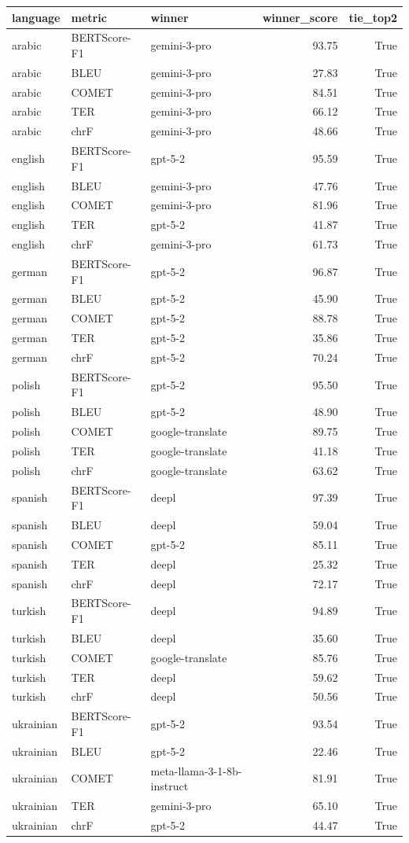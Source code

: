 \begin{tabular}{lllrr}
\toprule
language & metric & winner & winner\_score & tie\_top2 \\
\midrule
arabic & BERTScore-F1 & gemini-3-pro & 93.75 & True \\
arabic & BLEU & gemini-3-pro & 27.83 & True \\
arabic & COMET & gemini-3-pro & 84.51 & True \\
arabic & TER & gemini-3-pro & 66.12 & True \\
arabic & chrF & gemini-3-pro & 48.66 & True \\
english & BERTScore-F1 & gpt-5-2 & 95.59 & True \\
english & BLEU & gemini-3-pro & 47.76 & True \\
english & COMET & gemini-3-pro & 81.96 & True \\
english & TER & gpt-5-2 & 41.87 & True \\
english & chrF & gemini-3-pro & 61.73 & True \\
german & BERTScore-F1 & gpt-5-2 & 96.87 & True \\
german & BLEU & gpt-5-2 & 45.90 & True \\
german & COMET & gpt-5-2 & 88.78 & True \\
german & TER & gpt-5-2 & 35.86 & True \\
german & chrF & gpt-5-2 & 70.24 & True \\
polish & BERTScore-F1 & gpt-5-2 & 95.50 & True \\
polish & BLEU & gpt-5-2 & 48.90 & True \\
polish & COMET & google-translate & 89.75 & True \\
polish & TER & google-translate & 41.18 & True \\
polish & chrF & google-translate & 63.62 & True \\
spanish & BERTScore-F1 & deepl & 97.39 & True \\
spanish & BLEU & deepl & 59.04 & True \\
spanish & COMET & gpt-5-2 & 85.11 & True \\
spanish & TER & deepl & 25.32 & True \\
spanish & chrF & deepl & 72.17 & True \\
turkish & BERTScore-F1 & deepl & 94.89 & True \\
turkish & BLEU & deepl & 35.60 & True \\
turkish & COMET & google-translate & 85.76 & True \\
turkish & TER & deepl & 59.62 & True \\
turkish & chrF & deepl & 50.56 & True \\
ukrainian & BERTScore-F1 & gpt-5-2 & 93.54 & True \\
ukrainian & BLEU & gpt-5-2 & 22.46 & True \\
ukrainian & COMET & meta-llama-3-1-8b-instruct & 81.91 & True \\
ukrainian & TER & gemini-3-pro & 65.10 & True \\
ukrainian & chrF & gpt-5-2 & 44.47 & True \\
\bottomrule
\end{tabular}
